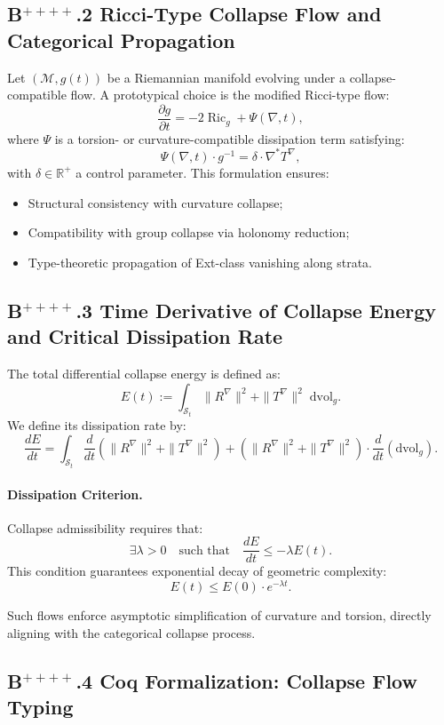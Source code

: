 \documentclass[11pt]{article}
\begin{document}
\subsection*{B$^{++++}$.2 Ricci-Type Collapse Flow and Categorical Propagation}

Let \( (\mathcal{M}, g(t)) \) be a Riemannian manifold evolving under a collapse-compatible flow. A prototypical choice is the modified Ricci-type flow:
\[
\frac{\partial g}{\partial t} = -2 \operatorname{Ric}_g + \Psi(\nabla, t),
\]
where \( \Psi \) is a torsion- or curvature-compatible dissipation term satisfying:
\[
\Psi(\nabla, t) \cdot g^{-1} = \delta \cdot \nabla^\ast T^\nabla,
\]
with \( \delta \in \mathbb{R}^+ \) a control parameter. This formulation ensures:
\begin{itemize}
  \item Structural consistency with curvature collapse;
  \item Compatibility with group collapse via holonomy reduction;
  \item Type-theoretic propagation of Ext-class vanishing along strata.
\end{itemize}

\subsection*{B$^{++++}$.3 Time Derivative of Collapse Energy and Critical Dissipation Rate}

The total differential collapse energy is defined as:
\[
E(t) := \int_{\mathcal{S}_t} \| R^\nabla \|^2 + \| T^\nabla \|^2 \; \mathrm{dvol}_g.
\]
We define its dissipation rate by:
\[
\frac{dE}{dt} = \int_{\mathcal{S}_t} \frac{d}{dt} \left( \| R^\nabla \|^2 + \| T^\nabla \|^2 \right) + (\| R^\nabla \|^2 + \| T^\nabla \|^2) \cdot \frac{d}{dt}(\mathrm{dvol}_g).
\]

\paragraph{Dissipation Criterion.}
Collapse admissibility requires that:
\[
\exists \lambda > 0 \quad \text{such that} \quad \frac{dE}{dt} \leq -\lambda E(t).
\]
This condition guarantees exponential decay of geometric complexity:
\[
E(t) \leq E(0) \cdot e^{-\lambda t}.
\]

Such flows enforce asymptotic simplification of curvature and torsion, directly aligning with the categorical collapse process.

\subsection*{B$^{++++}$.4 Coq Formalization: Collapse Flow Typing}
\end{document}
